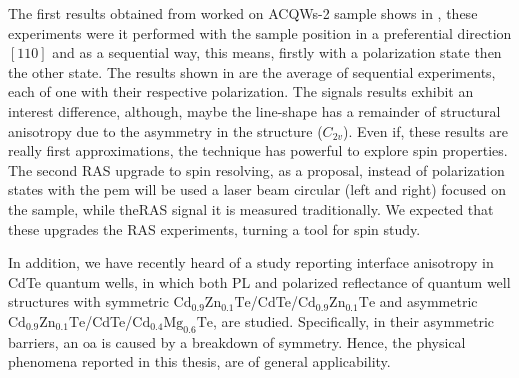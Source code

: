 The first results obtained from worked on \gls{ACQWs}-2 sample shows in , these experiments were it performed with the sample position in a preferential direction $[110]$
and as a sequential way, this means, firstly with a polarization state then the other state.
The results shown in  are the average of sequential experiments, each of one with
their respective polarization. The signals results exhibit an interest difference, although,
maybe the line-shape has a remainder of structural anisotropy due to the asymmetry in
the structure ($C_{2v}$).  Even if, these results are really first approximations, the technique has powerful to explore spin properties. The second RAS upgrade to spin resolving, as a proposal, instead of polarization states with the \gls{pem} will be used a laser beam circular (left and right) focused on the sample, while the\gls{RAS} signal it is measured traditionally. We expected that these upgrades the RAS experiments, turning a tool for spin study. 

In addition, we have recently heard of a study reporting interface anisotropy in CdTe quantum wells,
in which both PL and polarized reflectance of quantum well structures with symmetric
$\mathrm{Cd_{0.9}Zn_{0.1}Te}$/CdTe/$\mathrm{Cd_{0.9}Zn_{0.1}Te}$ and asymmetric $\mathrm{Cd_{0.9}Zn_{0.1}Te}$/CdTe/$\mathrm{Cd_{0.4}Mg_{0.6}Te}$, are studied\cite{kotova2022manifestation}. Specifically, in their asymmetric barriers, an \gls{oa} is caused by a breakdown of symmetry.
Hence, the physical phenomena reported in this thesis, are of general applicability.



